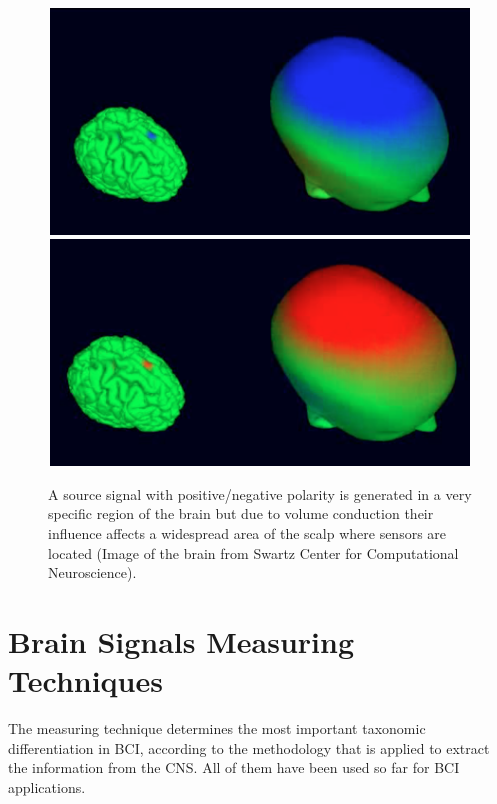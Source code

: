\begin{figure}[]
\centering
\includegraphics[height=6cm,width=1\textwidth]{images/volconduction1.png}
\includegraphics[height=6cm,width=1\textwidth]{images/volconduction2.png}
\caption[EEG Volume Conduction]{A source signal with positive/negative polarity is generated in a very specific region of the brain but due to volume conduction their influence affects a widespread area of the scalp where sensors are located (Image of the brain from Swartz Center for Computational Neuroscience).}
\label{fig:volconduction}
\end{figure}

\section{Brain Signals Measuring Techniques}

The measuring technique determines the most important taxonomic differentiation in BCI, according to the methodology that is applied to extract the information from the CNS.  All of them have been used so far for BCI applications.

